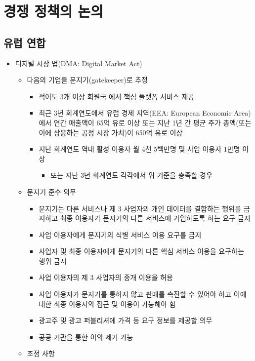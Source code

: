 \section{경쟁 정책의 논의}
\subsection{유럽 연합}
\begin{itemize}
\item 디지털 시장 법(DMA: Digital Market Act) 
	\begin{itemize}
	\item 다음의 기업을 문지기(gatekeeper)로 추정 \citep{Cremer:2019aa,choegyeyeong:2020we,gimhyeonsu-gang-ingyu:2020aa}
		\begin{itemize}
		\item 적어도 3개 이상 회원국 에서 핵심 플랫폼 서비스 제공
		\item 최근 3년 회계연도에서 유럽 경제 지역(EEA: European Economic Area)에서 연간 매출액이 65억 유로 이상 또는 지난 1년 간 평균 주가 총액(또는 이에 상응하는 공정 시장 가치)이 650억 유로 이상
		\item 지난 회계연도 역내 활성 이용자 월 4천 5백만명 및 사업 이용자 1만명 이상
			\begin{itemize}
			\item 또는 지난 3년 회계연도 각각에서 위 기준을 충족할 경우
			\end{itemize}
		\end{itemize}
	\item 문지기 준수 의무
		\begin{itemize}
		\item 문지기는 다른 서비스나 제 3 사업자의 개인 데이터를 결합하는 행위를 금지하고 최종 이용자가 문지기의 다른 서비스에 가입하도록 하는 요구 금지
		\item 사업 이용자에게 문지기의 식별 서비스 이용 요구를 금지
		\item 사업자 및 최종 이용자에게 문지기의 다른 핵심 서비스 이용을 요구하는 행위 금지
		\item 사업 이용자의 제 3 사업자의 중개 이용을 허용
		\item 사업 이용자가 문지기를 통하지 않고 판매를 촉진할 수 있어야 하고 이에 대한 최종 이용자의 접근 및 이용이 가능해야 함
		\item 광고주 및 광고 퍼블리셔에 가격 등 요구 정보를 제공할 의무
		\item 공공 기관을 통한 이의 제기 가능
		\end{itemize}	
	\item 조정 사항

\end{itemize}
\end{itemize}
